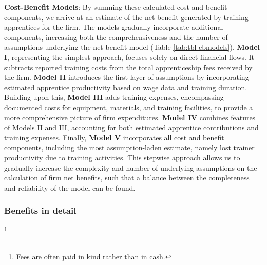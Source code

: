\documentclass[
  a4paper, twoside, 12pt]{book}
\renewcommand{\hl}[1]{#1}
\newcommand{\hlc}[2][color]{}
\begin{document}
\hl{\textbf{Cost-Benefit Models}: By summing these calculated cost and benefit components, we arrive at an estimate of the net benefit generated by training apprentices for the firm. The models gradually incorporate additional components, increasing both the comprehensiveness and the number of assumptions underlying the net benefit model (Table }\ref{tab:tbl-cbmodels}). \textbf{Model I}, \hl{representing the simplest approach, focuses solely on direct financial flows. It subtracts reported training costs from the total apprenticeship fees received by the firm. }\textbf{Model II} \hl{introduces the first layer of assumptions by incorporating estimated apprentice productivity based on wage data and training duration. Building upon this, }\textbf{Model III} \hl{adds training expenses, encompassing documented costs for equipment, materials, and training facilities, to provide a more comprehensive picture of firm expenditures. }\textbf{Model IV}\hl{ combines features of Models II and III, accounting for both estimated apprentice contributions and training expenses. Finally, }\textbf{Model V} \hl{incorporates all cost and benefit components, including the most assumption-laden estimate, namely lost trainer productivity due to training activities. This stepwise approach allows us to gradually increase the complexity and number of underlying assumptions on the calculation of firm net benefits, such that a balance between the completeness and reliability of the model can be found.}

\hypertarget{section-3}{%
\subsubsection*{\texorpdfstring{\hl{Benefits in detail}}{}}\label{section-3}}


\hlc[lightgray]{Firms receive two primary benefits from training: apprenticeship fees and the apprentices' productive contributions to the firm. Training fees can be paid in full before the commencement of training or split into payment at the beginning, during, and at the conclusion of training }\autocite{velenchik1995}\hlc[lightgray]{. Six categories of fees were reported by both apprentices and MCs: entry fees, formation (or general training) fees, liberation (or graduation) fees paid at the conclusion of training, fees as compensation for the materials and equipment used in training, contract fees, and application fees.}\footnote{Fees are often paid in kind rather than in cash.} \hlc[lightgray]{Fees were reported as the total paid for the entirety of the apprenticeship; we assume four-year apprenticeships to estimate annual amounts.}
\end{document}
